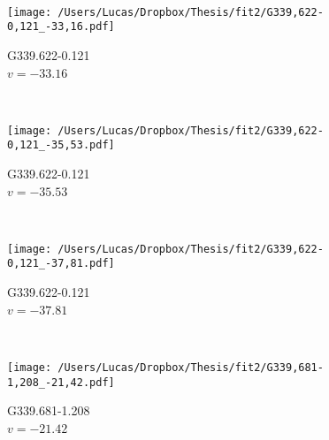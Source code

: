 \begin{figure*}[t]
\begin{subfigure}[t]{0.3\textwidth}
	\end{subfigure}
	~
	\begin{subfigure}[t]{0.3\textwidth}
		\texttt{[image: /Users/Lucas/Dropbox/Thesis/fit2/G339,622-0,121\_-33,16.pdf]}
		\caption[]{G339.622-0.121\\$v=-33.16$\,\kms}
	\end{subfigure}
	~
	\begin{subfigure}[t]{0.3\textwidth}
		\texttt{[image: /Users/Lucas/Dropbox/Thesis/fit2/G339,622-0,121\_-35,53.pdf]}
		\caption[]{G339.622-0.121\\$v=-35.53$\,\kms}
	\end{subfigure}
	~
	\begin{subfigure}[t]{0.3\textwidth}
		\texttt{[image: /Users/Lucas/Dropbox/Thesis/fit2/G339,622-0,121\_-37,81.pdf]}
		\caption[]{G339.622-0.121\\$v=-37.81$\,\kms}
	\end{subfigure}
	~
	\begin{subfigure}[t]{0.3\textwidth}
		\texttt{[image: /Users/Lucas/Dropbox/Thesis/fit2/G339,681-1,208\_-21,42.pdf]}
		\caption[]{G339.681-1.208\\$v=-21.42$\,\kms}
	\end{subfigure}
	~
\end{figure*}
\clearpage
